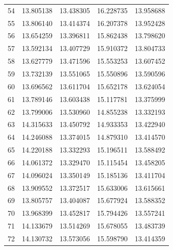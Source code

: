 \begin{table}
\begin{tabular}{rrrrr}
54 & 13.805138 & 13.438305 & 16.228735 & 13.958688 \\
55 & 13.806140 & 13.414374 & 16.207378 & 13.952428 \\
56 & 13.654259 & 13.396811 & 15.862438 & 13.798620 \\
57 & 13.592134 & 13.407729 & 15.910372 & 13.804733 \\
58 & 13.627779 & 13.471596 & 15.553253 & 13.607452 \\
59 & 13.732139 & 13.551065 & 15.550896 & 13.590596 \\
60 & 13.696562 & 13.611704 & 15.652178 & 13.624054 \\
61 & 13.789146 & 13.603438 & 15.117781 & 13.375999 \\
62 & 13.799006 & 13.530960 & 14.855238 & 13.332193 \\
63 & 14.315633 & 13.450792 & 14.933353 & 13.422940 \\
64 & 14.246088 & 13.374015 & 14.879310 & 13.414570 \\
65 & 14.220188 & 13.332293 & 15.196511 & 13.588492 \\
66 & 14.061372 & 13.329470 & 15.115454 & 13.458205 \\
67 & 14.096024 & 13.350149 & 15.185136 & 13.411704 \\
68 & 13.909552 & 13.372517 & 15.633006 & 13.615661 \\
69 & 13.805757 & 13.404087 & 15.677924 & 13.588352 \\
70 & 13.968399 & 13.452817 & 15.794426 & 13.557241 \\
71 & 14.133679 & 13.514269 & 15.678055 & 13.483739 \\
72 & 14.130732 & 13.573056 & 15.598790 & 13.414359 \\
\bottomrule
\end{tabular}
\end{table}
